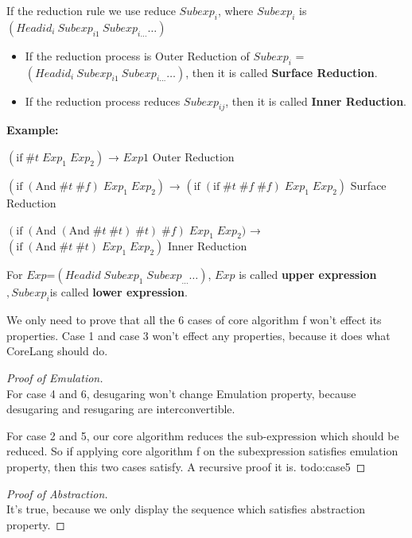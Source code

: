 If the reduction rule we use reduce $Subexp_{i}$, where $Subexp_{i}$ is $(Headid_{i}~Subexp_{i1}~Subexp_{i\ldots} \ldots)$
\begin{itemize}
	\item If the reduction process is Outer Reduction of $Subexp_{i}$ = $(Headid_{i}~Subexp_{i1}~Subexp_{i\ldots} \ldots)$, then it is called {\bfseries Surface Reduction}.
	\item If the reduction process reduces $Subexp_{ij}$, then it is called {\bfseries Inner Reduction}.
\end{itemize}

{\bfseries Example:}

$(\mbox{if}\; \#t\; Exp_{1}\; Exp_{2})$ → $Exp1$ \hfill Outer Reduction

$(\mbox{if}\; (\mbox{And}\; \#t\; \#f)\; Exp_{1}\; Exp_{2})$ → $(\mbox{if}\; (\mbox{if}\; \#t\; \#f\; \#f)\; Exp_{1}\; Exp_{2})$ \hfill Surface Reduction

$(\mbox{if}\; (\mbox{And}\; (\mbox{And}\; \#t\; \#t)\; \#t)\; \#f)\; Exp_{1}\; Exp_{2})$ → $(\mbox{if}\; (\mbox{And}\; \#t\; \#t)\; Exp_{1}\; Exp_{2})$ \hfill Inner Reduction

\begin{Def}
For $Exp$=$(Headid\;Subexp_{1}\;Subexp_{\ldots} \ldots)$, $Exp$ is called {\bfseries upper expression}$,Subexp_{i}$is called {\bfseries lower expression}.
\end{Def}

We only need to prove that all the 6 cases of core algorithm f won't effect its properties. Case 1 and case 3 won't effect any properties, because it does what CoreLang should do.

\begin{proof}[Proof of Emulation]
\hfill\\
For case 4 and 6, desugaring won't change Emulation property, because desugaring and resugaring are interconvertible.

For case 2 and 5, our core algorithm reduces the sub-expression which should be reduced. So if applying core algorithm f on the subexpression satisfies emulation property, then this two cases satisfy. A recursive proof it is.
todo:case5
\end{proof}

\begin{proof}[Proof of Abstraction]
\hfill\\
It's true, because we only display the sequence which satisfies abstraction property.
\end{proof}

